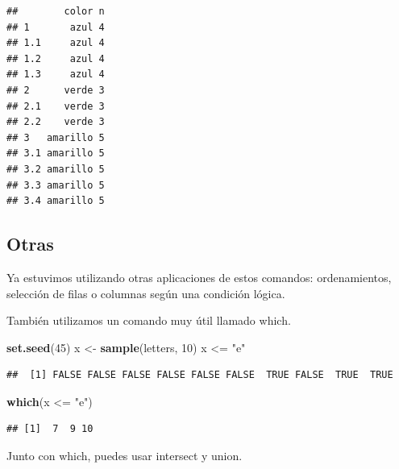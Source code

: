 \documentclass[]{article}
\newenvironment{Shaded}{\begin{snugshade}}{\end{snugshade}}
\newcommand{\KeywordTok}[1]{\textcolor[rgb]{0.13,0.29,0.53}{\textbf{{#1}}}}
\newcommand{\DecValTok}[1]{\textcolor[rgb]{0.00,0.00,0.81}{{#1}}}
\newcommand{\StringTok}[1]{\textcolor[rgb]{0.31,0.60,0.02}{{#1}}}
\newcommand{\NormalTok}[1]{{#1}}
\begin{document}
\begin{verbatim}
##        color n
## 1       azul 4
## 1.1     azul 4
## 1.2     azul 4
## 1.3     azul 4
## 2      verde 3
## 2.1    verde 3
## 2.2    verde 3
## 3   amarillo 5
## 3.1 amarillo 5
## 3.2 amarillo 5
## 3.3 amarillo 5
## 3.4 amarillo 5
\end{verbatim}

\subsection{Otras}\label{otras}

Ya estuvimos utilizando otras aplicaciones de estos comandos:
ordenamientos, selección de filas o columnas según una condición lógica.

También utilizamos un comando muy útil llamado which.

\begin{Shaded}
\begin{Highlighting}[]
\KeywordTok{set.seed}\NormalTok{(}\DecValTok{45}\NormalTok{)}
\NormalTok{x <-}\StringTok{ }\KeywordTok{sample}\NormalTok{(letters, }\DecValTok{10}\NormalTok{)}
\NormalTok{x <=}\StringTok{ "e"}
\end{Highlighting}
\end{Shaded}

\begin{verbatim}
##  [1] FALSE FALSE FALSE FALSE FALSE FALSE  TRUE FALSE  TRUE  TRUE
\end{verbatim}

\begin{Shaded}
\begin{Highlighting}[]
\KeywordTok{which}\NormalTok{(x <=}\StringTok{ "e"}\NormalTok{)}
\end{Highlighting}
\end{Shaded}

\begin{verbatim}
## [1]  7  9 10
\end{verbatim}

Junto con which, puedes usar intersect y union.
\end{document}
